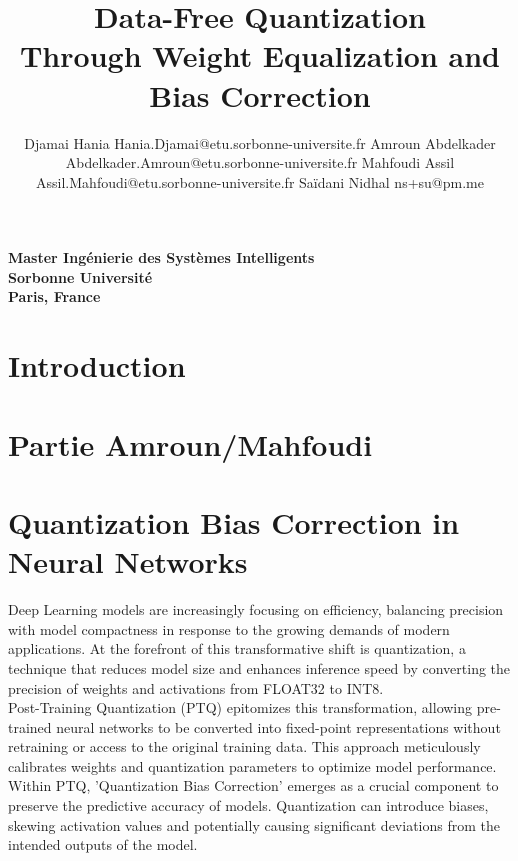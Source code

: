 \documentclass[10pt]{article}
\newcounter{prevyear}
\begin{document}
\title{Data-Free Quantization\\
Through Weight Equalization and Bias Correction}


\author{\name Djamai Hania \email Hania.Djamai@etu.sorbonne-universite.fr
       \AND
       \name Amroun Abdelkader \email Abdelkader.Amroun@etu.sorbonne-universite.fr
       \AND
       \name Mahfoudi Assil \email Assil.Mahfoudi@etu.sorbonne-universite.fr
       \AND
       \name Saïdani Nidhal \email ns+su@pm.me}

\newcommand{\addr}[1]{\noindent\textbf{Master Ingénierie des Systèmes Intelligents \\ 
Sorbonne Université \\ 
Paris, France}}

\addr

\maketitle



\section{Introduction}
\lipsum[1]
\section{Partie Amroun/Mahfoudi}
\lipsum[1]

\section{Quantization Bias Correction in Neural Networks}

Deep Learning models are increasingly focusing on efficiency, balancing precision with model compactness in response to the growing demands of modern applications. At the forefront of this transformative shift is quantization, a technique that reduces model size and enhances inference speed by converting the precision of weights and activations from FLOAT32 to INT8.\\

Post-Training Quantization (PTQ) epitomizes this transformation, allowing pre-trained neural networks to be converted into fixed-point representations without retraining or access to the original training data. This approach meticulously calibrates weights and quantization parameters to optimize model performance. Within PTQ, 'Quantization Bias Correction' emerges as a crucial component to preserve the predictive accuracy of models. Quantization can introduce biases, skewing activation values and potentially causing significant deviations from the intended outputs of the model.\\
\end{document}
